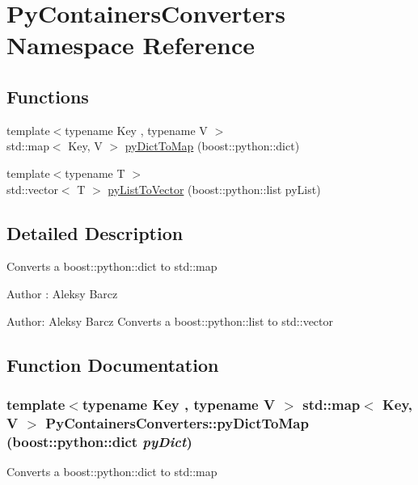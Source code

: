 \hypertarget{namespace_py_containers_converters}{
\section{PyContainersConverters Namespace Reference}
\label{namespace_py_containers_converters}
}
\subsection*{Functions}
\begin{DoxyCompactItemize}
\item 
{\footnotesize template$<$typename Key , typename V $>$ }\\std::map$<$ Key, V $>$ \hyperlink{namespace_py_containers_converters_a0299ebf5e53b19d95b2d488676fd3b5b}{pyDictToMap} (boost::python::dict)
\item 
{\footnotesize template$<$typename T $>$ }\\std::vector$<$ T $>$ \hyperlink{namespace_py_containers_converters_a8f3d92c41544fc4ee156509eaaf68729}{pyListToVector} (boost::python::list pyList)
\end{DoxyCompactItemize}


\subsection{Detailed Description}
Converts a boost::python::dict to std::map

\begin{DoxyAuthor}{Author}
: Aleksy Barcz
\end{DoxyAuthor}
Author: Aleksy Barcz Converts a boost::python::list to std::vector 

\subsection{Function Documentation}
\hypertarget{namespace_py_containers_converters_a0299ebf5e53b19d95b2d488676fd3b5b}{
\subsubsection[{pyDictToMap}]{\setlength{\rightskip}{0pt plus 5cm}template$<$typename Key , typename V $>$ std::map$<$ Key, V $>$ PyContainersConverters::pyDictToMap (boost::python::dict {\em pyDict})}}
\label{namespace_py_containers_converters_a0299ebf5e53b19d95b2d488676fd3b5b}
Converts a boost::python::dict to std::map

